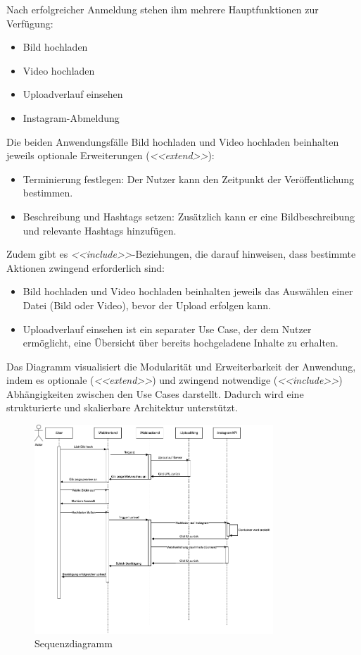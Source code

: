 Nach erfolgreicher Anmeldung stehen ihm mehrere Hauptfunktionen zur Verfügung:
\begin{itemize}
    \item Bild hochladen
    \item Video hochladen
    \item Uploadverlauf einsehen
    \item Instagram-Abmeldung
\end{itemize}

Die beiden Anwendungsfälle Bild hochladen und Video hochladen beinhalten jeweils optionale Erweiterungen (\textit{<<extend>>}):
\begin{itemize}
    \item Terminierung festlegen: Der Nutzer kann den Zeitpunkt der Veröffentlichung bestimmen.
    \item Beschreibung und Hashtags setzen: Zusätzlich kann er eine Bildbeschreibung und relevante Hashtags hinzufügen.
\end{itemize}

Zudem gibt es \textit{<<include>>}-Beziehungen, die darauf hinweisen, dass bestimmte Aktionen zwingend erforderlich sind:
\begin{itemize}
    \item Bild hochladen und Video hochladen beinhalten jeweils das Auswählen einer Datei (Bild oder Video), bevor der Upload erfolgen kann.
    \item Uploadverlauf einsehen ist ein separater Use Case, der dem Nutzer ermöglicht, eine Übersicht über bereits hochgeladene Inhalte zu erhalten.
\end{itemize}

Das Diagramm visualisiert die Modularität und Erweiterbarkeit der Anwendung, indem es optionale (\textit{<<extend>>}) und zwingend notwendige (\textit{<<include>>}) 
Abhängigkeiten zwischen den Use Cases darstellt. Dadurch wird eine strukturierte und skalierbare Architektur unterstützt.

\begin{figure}[htb]
    \centering
    \includegraphics[width=0.8\textwidth]{graphics/sequence_diagram.png}
    \caption{Sequenzdiagramm}
    \label{fig:fig-4}
\end{figure}

